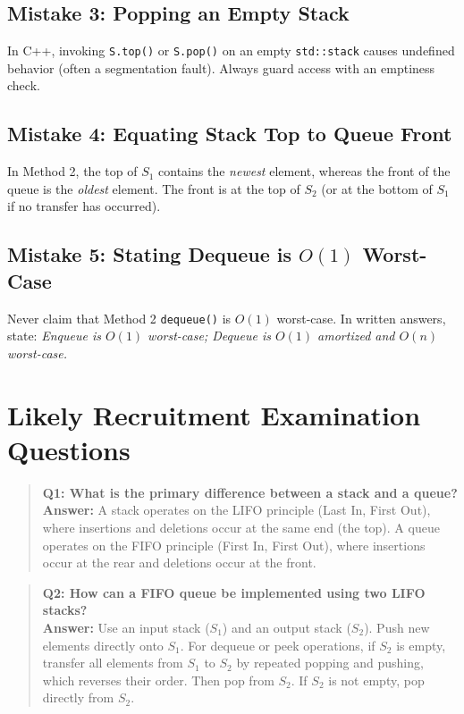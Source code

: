 \subsection{Mistake 3: Popping an Empty Stack}
In C++, invoking \texttt{S.top()} or \texttt{S.pop()} on an empty \texttt{std::stack} causes undefined behavior (often a segmentation fault). Always guard access with an emptiness check.

\subsection{Mistake 4: Equating Stack Top to Queue Front}
In Method 2, the top of $S_1$ contains the \emph{newest} element, whereas the front of the queue is the \emph{oldest} element. The front is at the top of $S_2$ (or at the bottom of $S_1$ if no transfer has occurred).

\subsection{Mistake 5: Stating Dequeue is $O(1)$ Worst-Case}
Never claim that Method 2 \texttt{dequeue()} is $O(1)$ worst-case. In written answers, state: \emph{Enqueue is $O(1)$ worst-case; Dequeue is $O(1)$ amortized and $O(n)$ worst-case.}

\section{Likely Recruitment Examination Questions}

\begin{quote}
\textbf{Q1: What is the primary difference between a stack and a queue?}\\
\textbf{Answer:} A stack operates on the LIFO principle (Last In, First Out), where insertions and deletions occur at the same end (the top). A queue operates on the FIFO principle (First In, First Out), where insertions occur at the rear and deletions occur at the front.
\end{quote}

\begin{quote}
\textbf{Q2: How can a FIFO queue be implemented using two LIFO stacks?}\\
\textbf{Answer:} Use an input stack ($S_1$) and an output stack ($S_2$). Push new elements directly onto $S_1$. For dequeue or peek operations, if $S_2$ is empty, transfer all elements from $S_1$ to $S_2$ by repeated popping and pushing, which reverses their order. Then pop from $S_2$. If $S_2$ is not empty, pop directly from $S_2$.
\end{quote}

